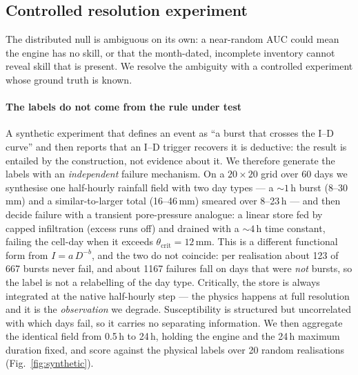 \documentclass[authoryear,preprint,review,12pt]{elsarticle}
\begin{document}
\subsection{Controlled resolution experiment}
\label{sec:synthetic}

The distributed null is ambiguous on its own: a near-random AUC could mean the
engine has no skill, or that the month-dated, incomplete inventory cannot reveal
skill that is present. We resolve the ambiguity with a controlled experiment whose
ground truth is known.

\paragraph{The labels do not come from the rule under test}
A synthetic experiment that defines an event as ``a burst that crosses the I--D
curve'' and then reports that an I--D trigger recovers it is deductive: the result
is entailed by the construction, not evidence about it. We therefore generate the
labels with an \emph{independent} failure mechanism. On a $20\times20$ grid over 60
days we synthesise one half-hourly rainfall field with two day types --- a
${\sim}1$\,h burst (8--30\,mm) and a similar-to-larger total (16--46\,mm) smeared
over 8--23\,h --- and then decide failure with a transient pore-pressure analogue:
a linear store fed by capped infiltration (excess runs off) and drained with a
${\sim}4$\,h time constant, failing the cell-day when it exceeds
$\theta_\mathrm{crit}=12$\,mm. This is a different functional form from
$I=a\,D^{-b}$, and the two do not coincide: per realisation about 123 of 667 bursts
never fail, and about 1167 failures fall on days that were \emph{not} bursts, so the
label is not a relabelling of the day type. Critically, the store is always
integrated at the native half-hourly step --- the physics happens at full
resolution and it is the \emph{observation} we degrade. Susceptibility is
structured but uncorrelated with which days fail, so it carries no separating
information. We then aggregate the identical field from 0.5\,h to 24\,h, holding
the engine and the 24\,h maximum duration fixed, and score against the physical
labels over 20 random realisations (Fig.~\ref{fig:synthetic}).
\end{document}
